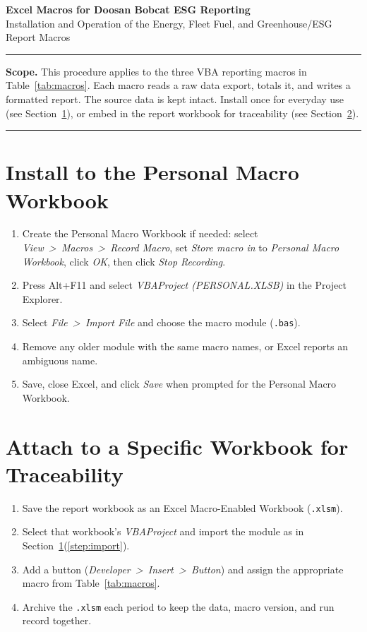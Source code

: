 \documentclass[11pt]{article}
\newcommand{\menu}[1]{\textit{#1}}
\newcommand{\gt}{~>\ }
\begin{document}
\begin{center}
  {\Large\bfseries Excel Macros for Doosan Bobcat ESG Reporting}\\[0.35em]
  {\normalsize Installation and Operation of the Energy, Fleet Fuel, and Greenhouse/ESG Report Macros}
\end{center}

\vspace{-0.4em}
\noindent\rule{\linewidth}{0.8pt}

\vspace{0.2em}
\textbf{Scope.} This procedure applies to the three VBA reporting macros in Table~\ref{tab:macros}. Each macro reads a
raw data export, totals it, and writes a formatted report. The source data is kept intact.
Install once for everyday use (see Section~\ref{sec:personal}), or embed in the report workbook for traceability (see Section~\ref{sec:attach}).

\vspace{-0.2em}
\noindent\rule{\linewidth}{0.4pt}

\section{Install to the Personal Macro Workbook}\label{sec:personal}
\begin{enumerate}
  \item Create the Personal Macro Workbook if needed: select \menu{View\gt Macros\gt Record Macro}, set
        \menu{Store macro in} to \menu{Personal Macro Workbook}, click \menu{OK}, then click \menu{Stop Recording}.
  \item Press Alt+F11 and select \menu{VBAProject (PERSONAL.XLSB)} in the Project Explorer.
  \item Select \menu{File\gt Import File} and choose the macro module (\texttt{.bas}).\label{step:import}
  \item Remove any older module with the same macro names, or Excel reports an ambiguous name.
  \item Save, close Excel, and click \menu{Save} when prompted for the Personal Macro Workbook.
\end{enumerate}

\section{Attach to a Specific Workbook for Traceability}\label{sec:attach}
\begin{enumerate}
  \item Save the report workbook as an Excel Macro-Enabled Workbook (\texttt{.xlsm}).
  \item Select that workbook's \menu{VBAProject} and import the module as in Section~\ref{sec:personal}(\ref{step:import}).
  \item Add a button (\menu{Developer\gt Insert\gt Button}) and assign the appropriate macro from Table~\ref{tab:macros}.
  \item Archive the \texttt{.xlsm} each period to keep the data, macro version, and run record together.
\end{enumerate}
\end{document}
